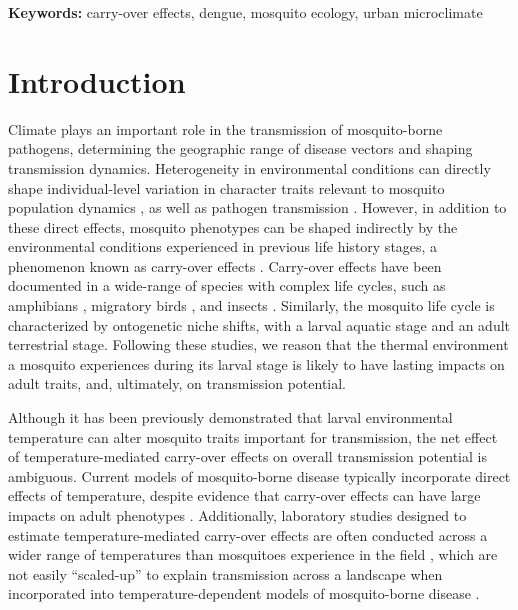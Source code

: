 \documentclass[12pt]{article}
\begin{document}
\smallskip

\textbf{Keywords:} carry-over effects, dengue, mosquito ecology, urban microclimate

\linenumbers

\doublespacing
\setlength\parindent{20pt}%

\newpage

\section{Introduction}

Climate plays an important role in the transmission of mosquito-borne pathogens, determining the geographic range of disease vectors and shaping transmission dynamics. Heterogeneity in environmental conditions can directly shape individual-level variation in character traits relevant to mosquito population dynamics \citep{delatte2009}, as well as pathogen transmission \citep{murdock2012}. However, in addition to these direct effects, mosquito phenotypes can be shaped indirectly by the environmental conditions experienced in previous life history stages, a phenomenon known as carry-over effects \citep{harrison2011}. Carry-over effects have been documented in a wide-range of species with complex life cycles, such as amphibians \citep{vonesh2005}, migratory birds \citep{norris2006}, and insects \citep{deblock2005a}. Similarly, the mosquito life cycle is characterized by ontogenetic niche shifts, with a larval aquatic stage and an adult terrestrial stage. Following these studies, we reason that the thermal environment a mosquito experiences during its larval stage is likely to have lasting impacts on adult traits, and, ultimately, on transmission potential.

Although it has been previously demonstrated that larval environmental temperature can alter mosquito traits important for transmission, the net effect of temperature-mediated carry-over effects on overall transmission potential is ambiguous. Current models of mosquito-borne disease typically incorporate direct effects of temperature, despite evidence that carry-over effects can have large impacts on adult phenotypes \citep{muturi2011c, muturi2011a, price2015}. Additionally, laboratory studies designed to estimate temperature-mediated carry-over effects are often conducted across a wider range of temperatures than mosquitoes experience in the field \citep{cator2013}, which are not easily ``scaled-up'' to explain transmission across a landscape when incorporated into temperature-dependent models of mosquito-borne disease \citep{reiner2013}.
\end{document}
